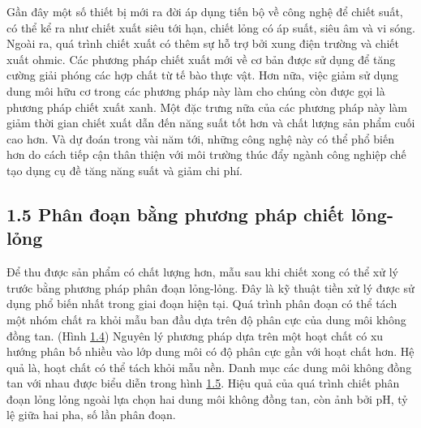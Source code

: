 \documentclass[
  letterpaper,
  DIV=11,
  numbers=noendperiod]{scrartcl}
\begin{document}
Gần đây một số thiết bị mới ra đời áp dụng tiến bộ về công nghệ để chiết
suất, có thể kể ra như chiết xuất siêu tới hạn, chiết lỏng có áp suất,
siêu âm và vi sóng. Ngoài ra, quá trình chiết xuất có thêm sự hỗ trợ bởi
xung điện trường và chiết xuất ohmic. Các phương pháp chiết xuất mới về
cơ bản được sử dụng để tăng cường giải phóng các hợp chất từ tế bào thực
vật. Hơn nữa, việc giảm sử dụng dung môi hữu cơ trong các phương pháp
này làm cho chúng còn được gọi là phương pháp chiết xuất xanh. Một đặc
trưng nữa của các phương pháp này làm giảm thời gian chiết xuất dẫn đến
năng suất tốt hơn và chất lượng sản phẩm cuối cao hơn. Và dự đoán trong
vài năm tới, những công nghệ này có thể phổ biến hơn do cách tiếp cận
thân thiện với môi trường thúc đẩy ngành công nghiệp chế tạo dụng cụ đề
tăng năng suất và giảm chi phí.

\subsection{1.5 Phân đoạn bằng phương pháp chiết
lỏng-lỏng}\label{phuxe2n-ux111oux1ea1n-bux1eb1ng-phux1b0ux1a1ng-phuxe1p-chiux1ebft-lux1ecfng-lux1ecfng}

Để thu được sản phẩm có chất lượng hơn, mẫu sau khi chiết xong có thể xử
lý trước bằng phương pháp phân đoạn lỏng-lỏng. Đây là kỹ thuật tiền xử
lý được sử dụng phổ biến nhất trong giai đoạn hiện tại. Quá trình phân
đoạn có thể tách một nhóm chất ra khỏi mẫu ban đầu dựa trên độ phân cực
của dung môi không đồng tan. (Hình
\hyperref[fig:Liquid-Liquidux5cux2520Extractor]{1.4}) Nguyên lý phương
pháp dựa trên một hoạt chất có xu hướng phân bố nhiều vào lớp dung môi
có độ phân cực gần với hoạt chất hơn. Hệ quả là, hoạt chất có thể tách
khỏi mẫu nền. Danh mục các dung môi không đồng tan với nhau được biểu
diễn trong hình
\hyperref[fig:Solventux5cux2520miscibilityux5cux2520chart]{1.5}. Hiệu
quả của quá trình chiết phân đoạn lỏng lỏng ngoài lựa chọn hai dung môi
không đồng tan, còn ảnh bởi pH, tỷ lệ giữa hai pha, số lần phân đoạn.
\end{document}
